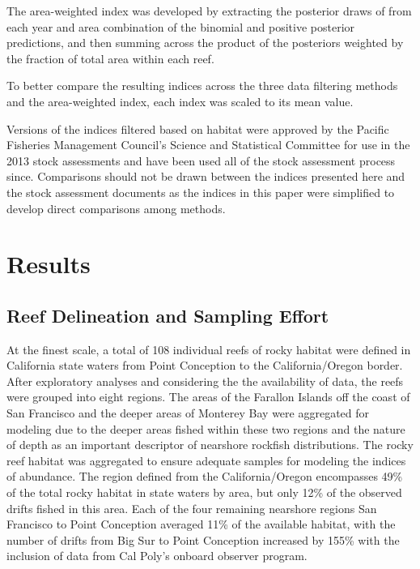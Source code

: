 \documentclass[
  authoryear,
  preprint,
  3p]{elsarticle}
\begin{document}
The area-weighted index was developed by extracting the posterior draws
of from each year and area combination of the binomial and positive
posterior predictions, and then summing across the product of the
posteriors weighted by the fraction of total area within each reef.

To better compare the resulting indices across the three data filtering
methods and the area-weighted index, each index was scaled to its mean
value.

Versions of the indices filtered based on habitat were approved by the
Pacific Fisheries Management Council's Science and Statistical Committee
for use in the 2013 stock assessments and have been used all of the
stock assessment process since. Comparisons should not be drawn between
the indices presented here and the stock assessment documents as the
indices in this paper were simplified to develop direct comparisons
among methods.

\hypertarget{results}{%
\section{Results}\label{results}}

\hypertarget{reef-delineation-and-sampling-effort}{%
\subsection{Reef Delineation and Sampling
Effort}\label{reef-delineation-and-sampling-effort}}

At the finest scale, a total of 108 individual reefs of rocky habitat
were defined in California state waters from Point Conception to the
California/Oregon border. After exploratory analyses and considering the
the availability of data, the reefs were grouped into eight regions. The
areas of the Farallon Islands off the coast of San Francisco and the
deeper areas of Monterey Bay were aggregated for modeling due to the
deeper areas fished within these two regions and the nature of depth as
an important descriptor of nearshore rockfish distributions. The rocky
reef habitat was aggregated to ensure adequate samples for modeling the
indices of abundance. The region defined from the California/Oregon
encompasses 49\% of the total rocky habitat in state waters by area, but
only 12\% of the observed drifts fished in this area. Each of the four
remaining nearshore regions San Francisco to Point Conception averaged
11\% of the available habitat, with the number of drifts from Big Sur to
Point Conception increased by 155\% with the inclusion of data from Cal
Poly's onboard observer program.
\end{document}
